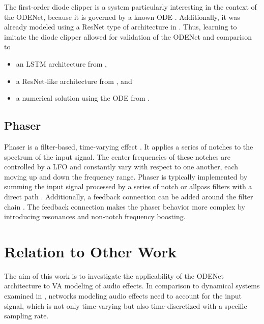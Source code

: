The first-order diode clipper is a system particularly interesting in the context of the ODENet, because it is governed by a known \ac{ODE} \cite{Yeh2007,Yeh2008}. Additionally, it was already modeled using a \ac{ResNet} type of architecture in \cite{Parker2019}. Thus, learning to imitate the diode clipper allowed for validation of the ODENet and comparison to 
\begin{itemize}
  \item an \ac{LSTM} architecture from \cite{Wrightetal2020},
  \item a \ac{ResNet}-like architecture from \cite{Parker2019}, and
  \item a numerical solution using the \ac{ODE} from \cite{Yeh2007,Yeh2008}.
\end{itemize}


\subsection{Phaser}
\label{subsec:phaser_intro}
Phaser is a filter-based, time-varying effect \cite{Zoelzer2011}. It applies a series of notches to the spectrum of the input signal. The center frequencies of these notches are controlled by a \ac{LFO} and constantly vary with respect to one another, each moving up and down the frequency range. Phaser is typically implemented by summing the input signal processed by a series of notch or allpass filters with a direct path \cite{Zoelzer2011}. Additionally, a feedback connection can be added around the filter chain \cite{Kiiski2016}. The feedback connection makes the phaser behavior more complex by introducing resonances and non-notch frequency boosting.

\section{Relation to Other Work}
\label{sec:relation_to_other_work}
The aim of this work is to investigate the applicability of the ODENet architecture to \ac{VA} modeling of audio effects. In comparison to dynamical systems examined in \cite{Karlsson2019}, networks modeling audio effects need to account for the input signal, which is not only time-varying but also time-discretized with a specific sampling rate. 

